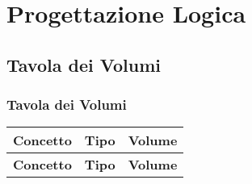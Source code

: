\section{Progettazione Logica}
	\subsection{Tavola dei Volumi}
		\subsubsection{Tavola dei Volumi}
		
			\begin{longtable}{| p{4cm} | p{4cm} | p{4cm} |}
				
				\hline
				\textbf{Concetto} & 
				\textbf{Tipo} & 
				\textbf{Volume} \\
				\hline
				
				\endfirsthead
				
				\hline
				\textbf{Concetto} & 
				\textbf{Tipo} & 
				\textbf{Volume} \\
				\hline
				
				\endhead
			

\end{longtable}
